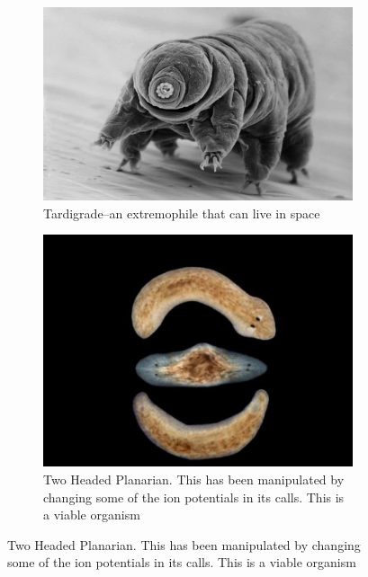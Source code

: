 \documentclass[]{article}
\begin{document}
\begin{figure}[H]
	\caption {Examples of "Life"}\label{fig:examples:of:life}
	\begin{subfigure}[t]{0.45\textwidth}
		\caption{Tardigrade--an extremophile that can live in space}\label{fig:tardigrade}
		\includegraphics[width=\textwidth]{Tardigrade}
	\end{subfigure}
	\begin{subfigure}[t]{0.45\textwidth}
		\caption{Two Headed Planarian. This has been manipulated by changing some of the ion potentials in its calls. This is a viable organism}\label{fig:2headed:planaria}
		\includegraphics[width=\textwidth]{TwoHeadedPlanaria}
	\end{subfigure}	
	
\end{figure}
\end{document}
